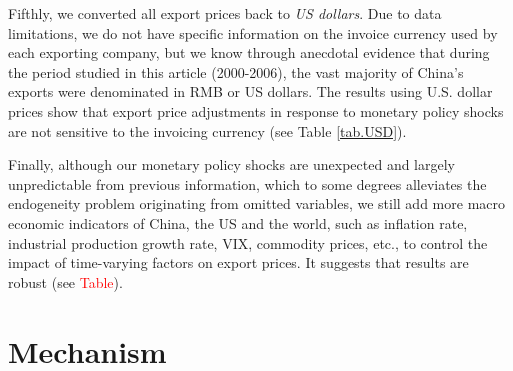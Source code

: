 Fifthly, we converted all export prices back to \textit{US dollars}. Due to data limitations, we do not have specific information on the invoice currency used by each exporting company, but we know through anecdotal evidence that during the period studied in this article (2000-2006), the vast majority of China's exports were denominated in RMB or US dollars. The results using U.S. dollar prices show that export price adjustments in response to monetary policy shocks are not sensitive to the invoicing currency (see Table \ref{tab.USD}).

Finally, although our monetary policy shocks are unexpected and largely unpredictable from previous information, which to some degrees alleviates the endogeneity problem originating from omitted variables, we still add more macro economic indicators of China, the US and the world, such as inflation rate, industrial production growth rate, VIX, commodity prices, etc., to control the impact of time-varying factors on export prices. It suggests that results are robust (see \textcolor{red}{Table}).


\newpage
\section{Mechanism}

